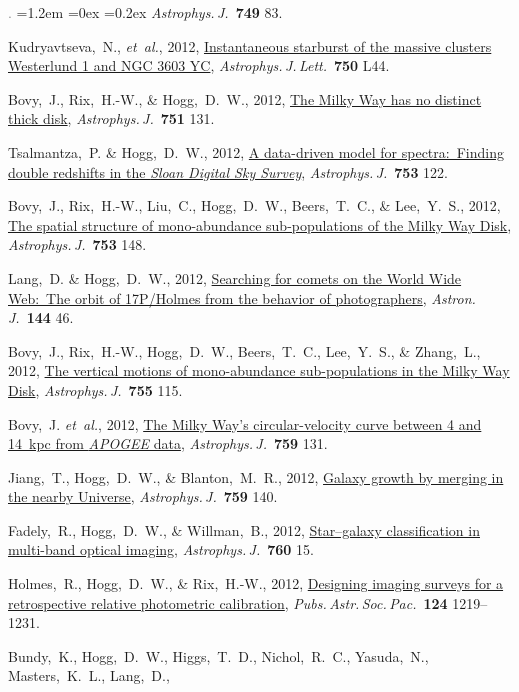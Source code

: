 \documentclass[10pt,letterpaper]{article}
\newcommand{\foreign}[1]{\textsl{#1}}
\newcommand{\etal}{\foreign{et~al.}}
\newcommand{\project}[1]{\textsl{#1}}
\newcommand{\doi}[2]{\href{http://dx.doi.org/#1}{{#2}}}
\newcommand{\deemph}[1]{\textcolor{grey}{\footnotesize{#1}}}
\newcommand{\pubnumber}[1]{\deemph{{#1}.}}
\newcounter{refpubnum}
\newcommand{\hogglist}{%
    \rightmargin=0in
    \leftmargin=1.2em
    \topsep=0ex
    \partopsep=0pt
    \itemsep=0.2ex
    \parsep=0pt
    \itemindent=-1.0\leftmargin
    \listparindent=0.0\leftmargin
    \settowidth{\labelsep}{~}
    \usecounter{refpubnum}
  }
\begin{document}
\begin{list}{\pubnumber{\therefpubnum}}{\hogglist}
\textit{Astrophys.\,J.}\ \textbf{749} 83.
\item
Kudryavtseva,~N., \etal, 2012,
\doi{10.1088/2041-8205/750/2/L44}{Instantaneous starburst of the massive clusters Westerlund 1 and NGC 3603 YC},
\textit{Astrophys.\,J.\,Lett.}\ \textbf{750} L44.
\item
Bovy,~J., Rix,~H.-W., \& Hogg,~D.~W., 2012,
\doi{10.1088/0004-637X/751/2/131}{The Milky Way has no distinct thick disk},
\textit{Astrophys.\,J.}\ \textbf{751} 131.
\item
Tsalmantza,~P. \& Hogg,~D.~W., 2012,
\doi{10.1088/0004-637X/753/2/122}{A data-driven model for spectra:\ Finding double redshifts in the \project{Sloan Digital Sky Survey}},
\textit{Astrophys.\,J.}\ \textbf{753} 122.
\item
Bovy,~J., Rix,~H.-W., Liu,~C., Hogg,~D.~W., Beers,~T.~C., \& Lee,~Y.~S., 2012,
\doi{10.1088/0004-637X/753/2/148}{The spatial structure of mono-abundance sub-populations of the Milky Way Disk},
\textit{Astrophys.\,J.}\ \textbf{753} 148.
\item
Lang,~D. \& Hogg,~D.~W., 2012,
\doi{10.1088/0004-6256/144/2/46}{Searching for comets on the World Wide Web:\ The orbit of 17P/Holmes from the behavior of photographers},
\textit{Astron.\,J.}\ \textbf{144} 46.
\item
Bovy,~J., Rix,~H.-W., Hogg,~D.~W., Beers,~T.~C., Lee,~Y.~S., \& Zhang,~L., 2012,
\doi{10.1088/0004-637X/755/2/115}{The vertical motions of mono-abundance sub-populations in the Milky Way Disk},
\textit{Astrophys.\,J.}\ \textbf{755} 115.
\item
Bovy,~J. \etal, 2012,
\doi{10.1088/0004-637X/759/2/131}{The Milky Way's circular-velocity curve between 4 and 14~kpc from \project{APOGEE} data},
\textit{Astrophys.\,J.}\ \textbf{759} 131.
\item
Jiang,~T., Hogg,~D.~W., \& Blanton,~M.~R., 2012,
\doi{10.1088/0004-637X/759/2/140}{Galaxy growth by merging in the nearby Universe},
\textit{Astrophys.\,J.}\ \textbf{759} 140.
\item
Fadely,~R., Hogg,~D.~W., \& Willman,~B., 2012,
\doi{10.1088/0004-637X/760/1/15}{Star--galaxy classification in multi-band optical imaging},
\textit{Astrophys.\,J.}\ \textbf{760} 15.
\item
Holmes,~R., Hogg,~D.~W., \& Rix,~H.-W., 2012,
\doi{10.1086/668656}{Designing imaging surveys for a retrospective relative photometric calibration},
\textit{Pubs.\,Astr.\,Soc.\,Pac.}\ \textbf{124} 1219--1231.
\item
Bundy,~K., Hogg,~D.~W., Higgs,~T.~D., Nichol,~R.~C., Yasuda,~N., Masters,~K.~L., Lang,~D.,

\end{list}
\end{document}
